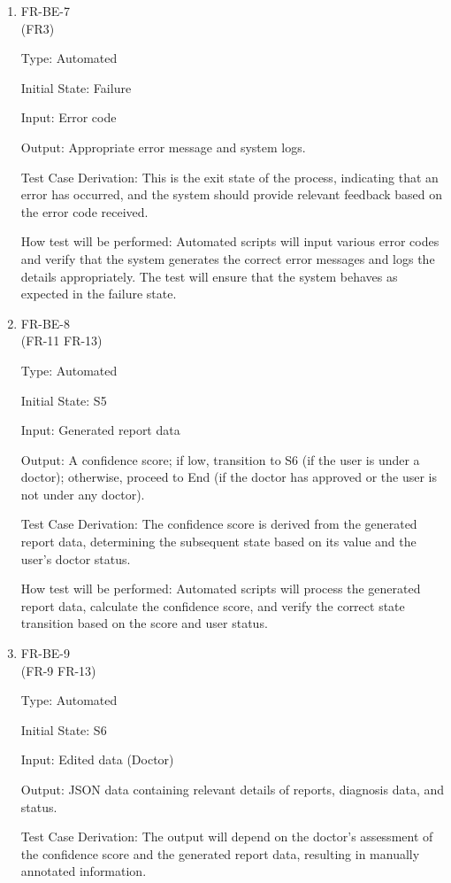 \documentclass[12pt, titlepage]{article}
\begin{document}
\begin{enumerate}
\item{FR-BE-7\\} (FR3)

Type: Automated 
					
Initial State: Failure
					
Input: Error code
					
Output: Appropriate error message and system logs.

Test Case Derivation: This is the exit state of the process, indicating that an error has occurred, and the system should provide relevant feedback based on the error code received.

How test will be performed: Automated scripts will input various error codes and verify that the system generates the correct error messages and logs the details appropriately. The test will ensure that the system behaves as expected in the failure state.

\item{FR-BE-8\\} (FR-11 FR-13)

Type: Automated 
					
Initial State: S5
					
Input: Generated report data
					
Output: A confidence score; if low, transition to S6 (if the user is under a doctor); otherwise, proceed to End (if the doctor has approved or the user is not under any doctor).

Test Case Derivation: The confidence score is derived from the generated report data, determining the subsequent state based on its value and the user's doctor status.

How test will be performed: Automated scripts will process the generated report data, calculate the confidence score, and verify the correct state transition based on the score and user status.

\item{FR-BE-9\\} (FR-9 FR-13)

Type: Automated
					
Initial State: S6
					
Input: Edited data (Doctor)
					
Output: JSON data containing relevant details of reports, diagnosis data, and status.

Test Case Derivation: The output will depend on the doctor's assessment of the confidence score and the generated report data, resulting in manually annotated information.


\end{enumerate}
\end{document}

